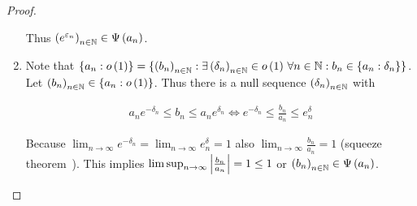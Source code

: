 \begin{proof}
\begin{enumerate}
      \noindent Thus $\seq{e^{\epsilon_n}} \in \bigpsi{a_n}$.

    \item

      Note that $\ean[\littleo{1}]{a_n} = \{ \seq{b_n} : \exists \seq{\delta_n} \in \littleo{1} \,\forall n\in\N: b_n \in \ean[\delta_n]{a_n}\}$. Let $\seq{b_n} \in \ean[\littleo{1}]{a_n}$. Thus there is a null sequence $\seq{\delta_n}$ with
      
      \begin{align}
        a_ne^{-\delta_n} \le b_n \le a_ne^{\delta_n} \iff e^{-\delta_n} \le \frac{b_n}{a_n} \le e^\delta_n
      \end{align}

      Because $\lim_{n\to\infty} e^{-\delta_n} = \lim_{n\to\infty} e^\delta_n = 1$ also $\lim_{n\to\infty} \frac{b_n}{a_n} = 1$ (squeeze theorem~\cite{wiki:squeeze}). This implies $\limsup_{n\to\infty} \abs{\frac{b_n}{a_n}} = 1 \le 1$ or $\seq{b_n} \in \bigpsi{a_n}$.
  \end{enumerate}
\end{proof}
